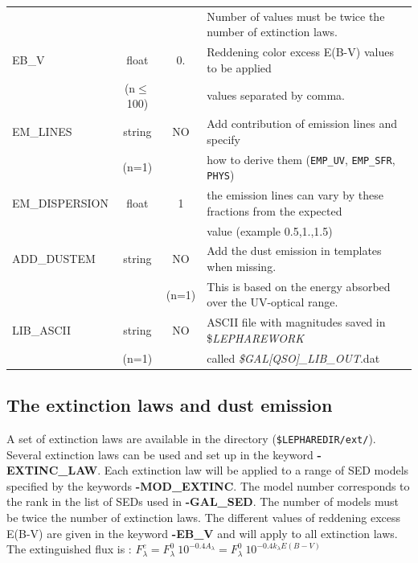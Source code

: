 \documentclass[12pt]{article}
\begin{document}
\begin{tabular}{lccl}
                          &             &       &  Number of values must be twice the number of extinction laws.\\
% 
 EB\_V          & float             & 0.  &  Reddening color excess E(B-V) values to be applied  \\
                     & (n$\le$100) &      &    values separated by comma.                    \\
%
 EM\_LINES  & string   &  NO  &  Add contribution of emission lines and specify     \\
                     & (n=1)    &         & how to derive them (\texttt{EMP\_UV}, \texttt{EMP\_SFR}, \texttt{PHYS})    \\
%
EM\_DISPERSION &   float  &  1   & the emission lines can vary by these fractions from the expected \\
 & & & value (example 0.5,1.,1.5) \\
%
ADD\_DUSTEM   & string  &  NO    & Add the dust emission in templates when missing. \\
              &         & (n=1)  & This is based on the energy absorbed over the UV-optical range.\\ 
%
 LIB\_ASCII    & string     &  NO  & ASCII file with magnitudes saved in \${\it LEPHAREWORK} \\
                      & (n=1)      &      & called {\it \$GAL[QSO]\_LIB\_OUT}.dat  \\
%
\hline
%
\end{tabular}
\vspace*{0.5cm}

\subsection{The extinction laws and dust emission}

A set of extinction laws are available in the directory (\texttt{\$LEPHAREDIR/ext/}). 
Several extinction laws can be used and set up in the keyword {\bf -EXTINC\_LAW}.
Each extinction law will be applied to a range of SED models specified by the keywords 
{\bf -MOD\_EXTINC}. The model number corresponds to the rank in the list of SEDs 
used in  {\bf -GAL\_SED}. 
 The number of models must be twice the number of extinction laws.  
 The different values of reddening excess E(B-V) are given in  the
 keyword {\bf -EB\_V} and will apply to all extinction laws. The extinguished flux is :
  $F_{\lambda}^e = F_{\lambda}^0\  10^{-0.4 A_{\lambda}}=  F_{\lambda}^0\  10^{-0.4 k_{\lambda} E(B-V)}$\\
 
\end{document}
